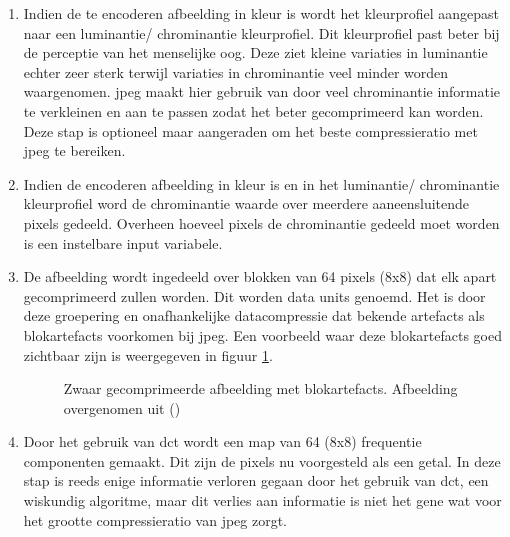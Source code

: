 \begin{enumerate}
	
	\item Indien de te encoderen afbeelding in kleur is wordt het kleurprofiel aangepast naar een luminantie/ chrominantie kleurprofiel. Dit kleurprofiel past beter bij de perceptie van het menselijke oog. Deze ziet kleine variaties in luminantie echter zeer sterk terwijl variaties in chrominantie veel minder worden waargenomen. \Gls{jpeg} maakt hier gebruik van door veel chrominantie informatie te verkleinen en aan te passen zodat het beter gecomprimeerd kan worden. Deze stap is optioneel maar aangeraden om het beste \gls{compressieratio} met \gls{jpeg} te bereiken.
	
	\item Indien de encoderen afbeelding in kleur is en in het luminantie/ chrominantie kleurprofiel word de chrominantie waarde over meerdere aaneensluitende pixels gedeeld. Overheen hoeveel pixels de chrominantie gedeeld moet worden is een instelbare input variabele.
	
	\item De afbeelding wordt ingedeeld over blokken van 64 pixels (8x8) dat elk apart gecomprimeerd zullen worden. Dit worden data units genoemd. Het is door deze groepering en onafhankelijke \gls{datacompressie} dat bekende \glspl{artefact} als blok\glspl{artefact} voorkomen bij \gls{jpeg}. Een voorbeeld waar deze blok\glspl{artefact} goed zichtbaar zijn is weergegeven in figuur \ref{fig:block-artefact}.
	
	\begin{figure}
		\centering
		\caption{Zwaar gecomprimeerde afbeelding met blok\glspl{artefact}. Afbeelding overgenomen uit  (\cite{blokartefact})}
		\label{fig:block-artefact}
	\end{figure}
	
	\item Door het gebruik van \gls{dct} wordt een map van 64 (8x8) frequentie componenten gemaakt. Dit zijn de pixels nu voorgesteld als een getal. In deze stap is reeds enige informatie verloren gegaan door het gebruik van \gls{dct}, een wiskundig algoritme, maar dit verlies aan informatie is niet het gene wat voor het grootte \gls{compressieratio} van \gls{jpeg} zorgt.
	

\end{enumerate}
